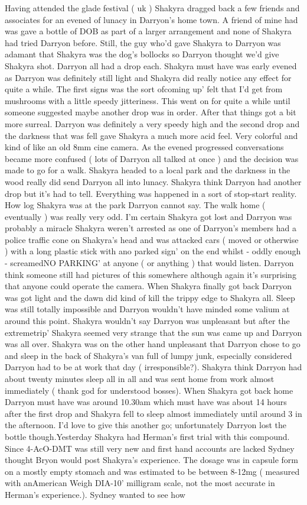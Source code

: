 \documentclass[12pt]{book}
\begin{document}
Having attended the glade festival ( uk ) Shakyra dragged back a few friends and associates for an evened of lunacy in Darryon's home town. A friend of mine had was gave a bottle of DOB as part of a larger arrangement and none of Shakyra had tried Darryon before. Still, the guy who'd gave Shakyra to Darryon was adamant that Shakyra was the dog's bollocks so Darryon thought we'd give Shakyra shot. Darryon all had a drop each. Shakyra must have was early evened as Darryon was definitely still light and Shakyra did really notice any effect for quite a while. The first signs was the sort ofcoming up' felt that I'd get from mushrooms with a little speedy jitteriness. This went on for quite a while until someone suggested maybe another drop was in order. After that things got a bit more surreal. Darryon was definitely a very speedy high and the second drop and the darkness that was fell gave Shakyra a much more acid feel. Very colorful and kind of like an old 8mm cine camera. As the evened progressed conversations became more confused ( lots of Darryon all talked at once ) and the decision was made to go for a walk. Shakyra headed to a local park and the darkness in the wood really did send Darryon all into lunacy. Shakyra think Darryon had another drop but it's had to tell. Everything was happened in a sort of stop-start reality. How log Shakyra was at the park Darryon cannot say. The walk home ( eventually ) was really very odd. I'm certain Shakyra got lost and Darryon was probably a miracle Shakyra weren't arrested as one of Darryon's members had a police traffic cone on Shakyra's head and was attacked cars ( moved or otherwise ) with a long plastic stick with ano parked sign' on the end whilst - oddly enough - screamedNO PARKING' at anyone ( or anything ) that would listen. Darryon think someone still had pictures of this somewhere although again it's surprising that anyone could operate the camera. When Shakyra finally got back Darryon was got light and the dawn did kind of kill the trippy edge to Shakyra all. Sleep was still totally impossible and Darryon wouldn't have minded some valium at around this point. Shakyra wouldn't say Darryon was unpleasant but after the extremetrip' Shakyra seemed very strange that the sun was came up and Darryon was all over. Shakyra was on the other hand unpleasant that Darryon chose to go and sleep in the back of Shakyra's van full of lumpy junk, especially considered Darryon had to be at work that day ( irresponsible?). Shakyra think Darryon had about twenty minutes sleep all in all and was sent home from work almost immediately ( thank god for understood bosses). When Shakyra got back home Darryon must have was around 10.30am which must have was about 14 hours after the first drop and Shakyra fell to sleep almost immediately until around 3 in the afternoon. I'd love to give this another go; unfortunately Darryon lost the bottle though.Yesterday Shakyra had Herman's first trial with this compound. Since 4-AcO-DMT was still very new and first hand accounts are lacked Sydney thought Bryon would post Shakyra's experience. The dosage was in capsule form on a mostly empty stomach and was estimated to be between 8-12mg ( measured with anAmerican Weigh DIA-10' milligram scale, not the most accurate in Herman's experience.). Sydney wanted to see how 
\end{document}
